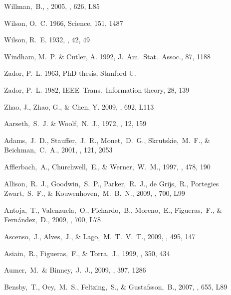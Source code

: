 \begin{thebibliography}{99}
  Willman,~B., \etal, 2005,
  \apjl, 626, L85

{Wilson}, O.~C. 1966, Science, 151, 1487

{Wilson}, R.~E. 1932, \aj, 42, 49

{Windham}, M.~P. \& {Cutler}, A. 1992, {J.~Am.~Stat.~Assoc.}, 87, 1188

{Zador}, P.~L. 1963, PhD thesis, Stanford U.

{Zador}, P.~L. 1982, {IEEE~Trans.~Information theory}, 28, 139

{Zhao}, J., {Zhao}, G., \& {Chen}, Y. 2009, \apjl, 692, L113



  Aarseth,~S.~J. \& Woolf,~N.~J., 1972,
  \aplett, 12, 159

  Adams,~J.~D., Stauffer,~J.~R., Monet,~D.~G., Skrutskie,~M.~F., \& Beichman,~C.~A., 2001,
  \aj, 121, 2053

  Afflerbach,~A., Churchwell,~E., \& Werner,~W.~M., 1997,
  \apj, 478, 190

  Allison,~R.~J., Goodwin,~S.~P., Parker,~R.~J., de Grijs,~R., Portegies Zwart,~S.~F., \& Kouwenhoven,~M.~B.~N., 2009,
  \apjl, 700, L99

  Antoja,~T., Valenzuela,~O., Pichardo,~B., Moreno,~E., Figueras,~F., \& Fern{\'a}ndez,~D., 2009,
  \apjl, 700, L78

  Ascenso,~J., Alves,~J., \& Lago,~M.~T.~V.~T., 2009,
  \aap, 495, 147

  Asiain,~R., Figueras,~F., \& Torra,~J., 1999,
  \aap, 350, 434

  Aumer,~M.~\& Binney,~J.~J., 2009,
  \mnras, 397, 1286

  Bensby,~T., Oey,~M.~S., Feltzing,~S., \& Gustafsson,~B., 2007,
  \apjl, 655, L89


\end{thebibliography}
